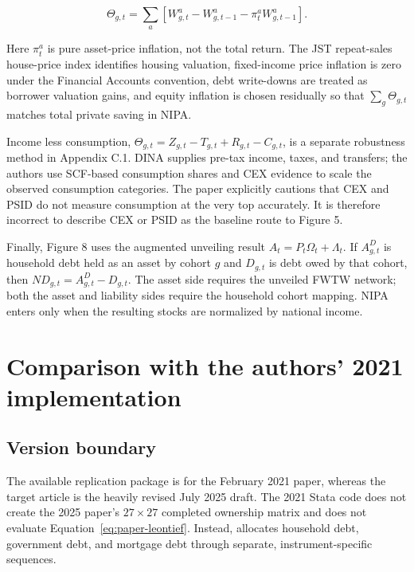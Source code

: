 \documentclass[11pt]{article}
\begin{document}
\begin{equation}
  \Theta_{g,t}
  =\sum_a\left[
    W^a_{g,t}-W^a_{g,t-1}-\pi^a_tW^a_{g,t-1}
  \right].
  \label{eq:distributional-saving}
\end{equation}

Here \(\pi^a_t\) is pure asset-price inflation, not the total return.  The JST
repeat-sales house-price index identifies housing valuation, fixed-income
price inflation is zero under the Financial Accounts convention, debt
write-downs are treated as borrower valuation gains, and equity inflation is
chosen residually so that \(\sum_g\Theta_{g,t}\) matches total private saving
in NIPA.

Income less consumption,
\(\Theta_{g,t}=Z_{g,t}-T_{g,t}+R_{g,t}-C_{g,t}\), is a separate robustness
method in Appendix C.1.  DINA supplies pre-tax income, taxes, and transfers;
the authors use SCF-based consumption shares and CEX evidence to scale the
observed consumption categories.  The paper explicitly cautions that CEX and
PSID do not measure consumption at the very top accurately.  It is therefore
incorrect to describe CEX or PSID as the baseline route to Figure 5.

Finally, Figure 8 uses the augmented unveiling result
\(A_t=P_t\Omega_t+\Lambda_t\).  If \(A^D_{g,t}\) is household debt held as an
asset by cohort \(g\) and \(D_{g,t}\) is debt owed by that cohort, then
\(ND_{g,t}=A^D_{g,t}-D_{g,t}\).  The asset side requires the unveiled FWTW
network; both the asset and liability sides require the household cohort
mapping.  NIPA enters only when the resulting stocks are normalized by
national income.

\section{Comparison with the authors' 2021 implementation}
\label{sec:comparison}

\subsection{Version boundary}

The available replication package is for the February 2021 paper, whereas the
target article is the heavily revised July 2025 draft. The 2021 Stata code does
not create the 2025 paper's $27\times27$ completed ownership matrix and does not
evaluate Equation~\eqref{eq:paper-leontief}. Instead,
 allocates
household debt, government debt, and mortgage debt through separate,
instrument-specific sequences.
\end{document}
